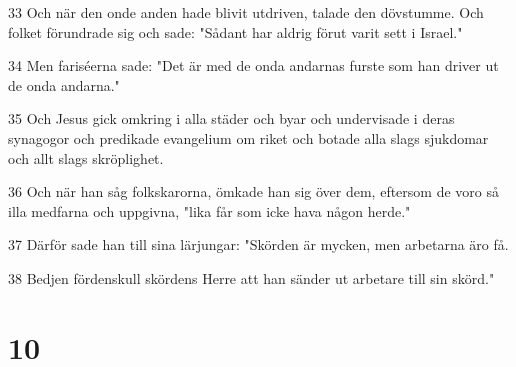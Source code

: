\par 33 Och när den onde anden hade blivit utdriven, talade den dövstumme. Och folket förundrade sig och sade: "Sådant har aldrig förut varit sett i Israel."
\par 34 Men fariséerna sade: "Det är med de onda andarnas furste som han driver ut de onda andarna."
\par 35 Och Jesus gick omkring i alla städer och byar och undervisade i deras synagogor och predikade evangelium om riket och botade alla slags sjukdomar och allt slags skröplighet.
\par 36 Och när han såg folkskarorna, ömkade han sig över dem, eftersom de voro så illa medfarna och uppgivna, "lika får som icke hava någon herde."
\par 37 Därför sade han till sina lärjungar: "Skörden är mycken, men arbetarna äro få.
\par 38 Bedjen fördenskull skördens Herre att han sänder ut arbetare till sin skörd."

\chapter{10}

